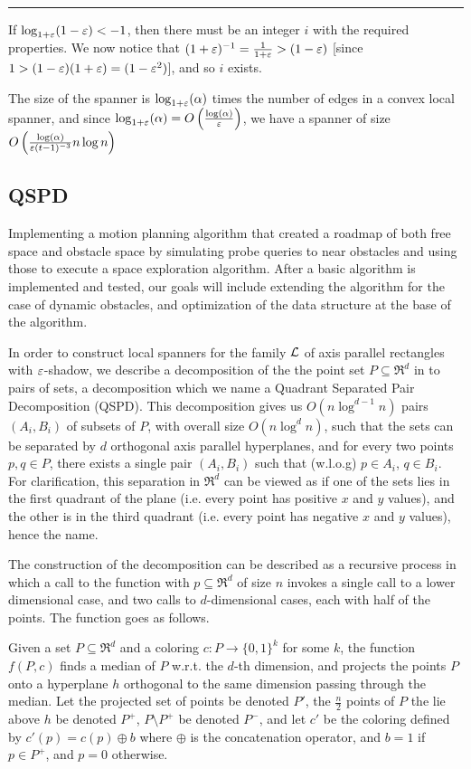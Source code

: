 \documentclass[12pt]{article}%
\begin{document}
\hrule

If $\log_{1+\varepsilon}(1-\varepsilon)<-1$, then there must be an integer $i$ with
the required properties. We now notice that
$(1+\varepsilon)^{-1}=\frac{1}{1+\varepsilon}>(1-\varepsilon)$ [since
$1>(1-\varepsilon)(1+\varepsilon)=(1-\varepsilon^2)$], and so $i$ exists.

The size of the spanner is $\log_{1+\varepsilon}(\alpha)$ times the number of
edges in a convex local spanner, and since
$\log_{1+\varepsilon}(\alpha)=O\left(\frac{\log(\alpha)}{\varepsilon}\right)$, we
have a spanner of size
$O\left(\frac{\log(\alpha)}{\varepsilon (t-1)^{-3}}n\log n\right)$

\subsection{QSPD}
Implementing a motion planning algorithm that created a roadmap of
both free space and obstacle space by simulating probe queries to near
obstacles and using those to execute a space exploration algorithm.
After a basic algorithm is implemented and tested, our goals will
include extending the algorithm for the case of dynamic obstacles, and
optimization of the data structure at the base of the algorithm.

In order to construct local spanners for the family $\mathcal{L}$ of axis
parallel rectangles with $\varepsilon$-shadow, we describe a decomposition of
the the point set $P\subseteq \Re^d$ in to pairs of sets, a
decomposition which we name a Quadrant Separated Pair Decomposition
(QSPD). This decomposition gives us $O(n\log^{d-1}n)$ pairs
$(A_i,B_i)$ of subsets of $P$, with overall size $O(n\log^{d}n)$, such
that the sets can be separated by $d$ orthogonal axis parallel
hyperplanes, and for every two points $p,q\in P$, there exists a
single pair $(A_i,B_i)$ such that (w.l.o.g) $p\in A_i$, $q\in
B_i$. For clarification, this separation in $\Re^d$ can be viewed as
if one of the sets lies in the first quadrant of the plane (i.e. every
point has positive $x$ and $y$ values), and the other is in the third
quadrant (i.e. every point has negative $x$ and $y$ values), hence the
name.

The construction of the decomposition can be described as a recursive
process in which a call to the function with $p\subseteq \Re^d$ of
size $n$ invokes a single call to a lower dimensional case, and two
calls to $d$-dimensional cases, each with half of the points. The
function goes as follows.

Given a set $P\subseteq \Re^d$ and a coloring
$c:P\longrightarrow \{0,1\}^k$ for some $k$, the function $f(P,c)$
finds a median of $P$ w.r.t. the $d$-th dimension, and projects the
points $P$ onto a hyperplane $h$ orthogonal to the same dimension
passing through the median. Let the projected set of points be denoted
$P'$, the $\frac{n}{2}$ points of $P$ the lie above $h$ be denoted
$P^+$, $P\setminus P^+$ be denoted $P^-$, and let $c'$ be the coloring
defined by $c'(p)=c(p)\oplus b$ where $\oplus$ is the concatenation
operator, and $b=1$ if $p\in P^+$, and $p=0$ otherwise.
\end{document}

